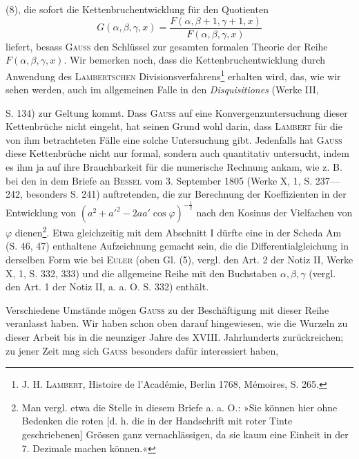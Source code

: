 (8), die sofort die Kettenbruchentwicklung für den Quotienten
\begingroup\makeatletter\tagsleft@true\let\veqno\leqno\makeatother
\begin{equation*}
G(\alpha,\beta,\gamma,x)=\frac{F(\alpha,\beta+1,\gamma+1,x)}{F(\alpha,\beta,\gamma,x)}\tag{9}
\end{equation*}\endgroup
\noindent liefert, besass \textsc{Gauss} den Schlüssel zur gesamten formalen Theorie der Reihe
\(F(\alpha,\beta,\gamma,x)\). Wir bemerken noch, dass die Kettenbruchentwicklung durch
Anwendung des \textsc{Lambertschen} Divisionsverfahrens\footnote{J. H. \textsc{Lambert}, Histoire de l’Académie, Berlin 1768, Mémoires, S. 265.} erhalten wird, das, wie
wir sehen werden, auch im allgemeinen Falle in den \textit{Disquisitiones} (Werke III,\par
{}
\clearpage{}
\noindent S. 134) zur Geltung kommt. Dass \textsc{Gauss} auf eine Konvergenzuntersuchung
dieser Kettenbrüche nicht eingeht, hat seinen Grund wohl darin, dass \textsc{Lambert}
für die von ihm betrachteten Fälle eine solche Untersuchung gibt. Jedenfalls
hat \textsc{Gauss} diese Kettenbrüche nicht nur formal, sondern auch quantitativ
untersucht, indem es ihm ja auf ihre Brauchbarkeit für die numerische Rechnung
ankam, wie z. B. bei den in dem Briefe an \textsc{Bessel} vom 3. September
1805 (Werke X, 1, S. 237—242, besonders S. 241) auftretenden, die zur Berechnung
der Koeffizienten in der Entwicklung von \((a^2+a'^2-2aa'\cos\varphi)^{-\frac12}\)
nach den Kosinus der Vielfachen von \(\varphi\) dienen\footnote{Man vergl. etwa die Stelle in diesem Briefe a. a. O.: »Sie können hier ohne Bedenken die roten [d. h. die in der Handschrift mit roter Tinte geschriebenen] Grössen ganz vernachlässigen, da sie kaum eine Einheit in der 7. Dezimale machen können.«}.
Etwa gleichzeitig mit
dem Abschnitt I dürfte eine in der Scheda Am (S. 46, 47) enthaltene Aufzeichnung
gemacht sein, die die Differentialgleichung in derselben Form wie
bei \textsc{Euler} (oben Gl. (5), vergl. den Art. 2 der Notiz II, Werke X, 1, S. 332,
333) und die allgemeine Reihe mit den Buchstaben \(\alpha,\beta,\gamma\) (vergl. den Art. 1
der Notiz II, a. a. O. S. 332) enthält.
\par
Verschiedene Umstände mögen \textsc{Gauss} zu der Beschäftigung mit dieser
Reihe veranlasst haben. Wir haben schon oben darauf hingewiesen, wie die
Wurzeln zu dieser Arbeit bis in die neunziger Jahre des XVIII. Jahrhunderts
zurückreichen; zu jener Zeit mag sich \textsc{Gauss} besonders dafür interessiert haben,
